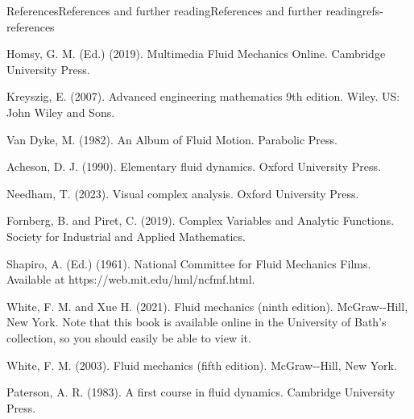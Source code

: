 \documentclass[oneside,10pt,]{book}
\numberwithin{equation}{section}
\begin{document}
\begin{references-chapter-numberless}{References}{References and further reading}{}{References and further reading}{}{}{refs-references}
\setcounter{equation}{0}%
\renewcommand{\theequation}{\arabic{equation}}%
\begin{referencelist}
\hypertarget{ref-homsy}{}Homsy, G. M. (Ed.) (2019). Multimedia Fluid Mechanics Online. Cambridge University Press.%

\hypertarget{ref-kreyszig}{}Kreyszig, E. (2007). Advanced engineering mathematics 9th edition. Wiley. US: John Wiley and Sons.%

\hypertarget{ref-album}{}Van Dyke, M. (1982). An Album of Fluid Motion. Parabolic Press.%

\hypertarget{ref-acheson}{}Acheson, D. J. (1990). Elementary fluid dynamics. Oxford University Press.%

\hypertarget{ref-needham}{}Needham, T. (2023). Visual complex analysis. Oxford University Press.%

\hypertarget{ref-fornberg}{}Fornberg, B. and Piret, C. (2019). Complex Variables and Analytic Functions. Society for Industrial and Applied Mathematics.%

\hypertarget{ref-ncfmf}{}Shapiro, A. (Ed.) (1961). National Committee for Fluid Mechanics Films. Available at https:\slash{}\slash{}web.mit.edu\slash{}hml\slash{}ncfmf.html.%

\hypertarget{ref-white-9}{}White, F. M. and Xue H. (2021). Fluid mechanics (ninth edition). McGraw-{}-{}Hill, New York. Note that this book is available online in the University of Bath's collection, so you should easily be able to view it.%

\hypertarget{ref-white-5}{}White, F. M. (2003). Fluid mechanics (fifth edition). McGraw-{}-{}Hill, New York.%

\hypertarget{ref-paterson}{}Paterson, A. R. (1983). A first course in fluid dynamics. Cambridge University Press.%

\end{referencelist}
\end{references-chapter-numberless}
\end{document}

